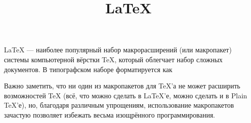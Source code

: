\documentclass[12pt]{article}
\title{\LaTeX}
\date{}
\author{}
\begin{document}
LaTeX — наиболее
 популярный набор макрорасширений (или макропакет) системы компьютерной вёрстки TeX, который 
 облегчает набор сложных документов. В типографском наборе форматируется как 

Важно заметить, что ни один из макропакетов для TeX’а не может расширить возможностей TeX 
(всё, что можно сделать в LaTeX’е, можно сделать и в Plain TeX’е), но, благодаря различным 
упрощениям, использование макропакетов зачастую позволяет избежать весьма изощрённого 
программирования.
\end{document}
